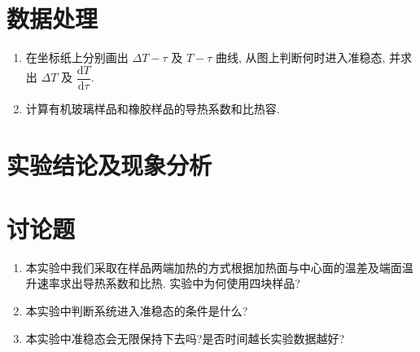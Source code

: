 \documentclass[signature=data]{physicsreport}
\begin{document}
\makeatletter
{}
\makeatother

\newpage
\section{数据处理}
\begin{enumerate}
    \item 在坐标纸上分别画出 $\Delta T-\tau$ 及 $T-\tau$ 曲线, 从图上判断何时进入准稳态, 并求出 $\Delta T$ 及 $\dfrac{\mathrm{d}T}{\mathrm{d}\tau}$.
    \item 计算有机玻璃样品和橡胶样品的导热系数和比热容.
\end{enumerate}

\newpage
\section{实验结论及现象分析}

\vspace*{6cm}
\section{讨论题}
\begin{enumerate}
    \item 本实验中我们采取在样品两端加热的方式根据加热面与中心面的温差及端面温升速率求出导热系数和比热. 实验中为何使用四块样品?
    \item 本实验中判断系统进入准稳态的条件是什么?
    \item 本实验中准稳态会无限保持下去吗?是否时间越长实验数据越好?
\end{enumerate}
\end{document}

